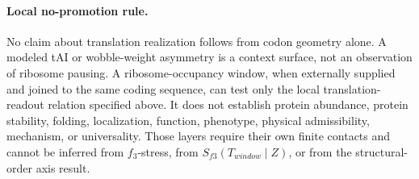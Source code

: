 \paragraph{Local no-promotion rule.}
No claim about translation realization follows from codon geometry alone.  A modeled tAI or wobble-weight asymmetry is a context surface, not an observation of ribosome pausing.  A ribosome-occupancy window, when externally supplied and joined to the same coding sequence, can test only the local translation-readout relation specified above.  It does not establish protein abundance, protein stability, folding, localization, function, phenotype, physical admissibility, mechanism, or universality.  Those layers require their own finite contacts and cannot be inferred from $f_3$-stress, from $S_{f3}(T_{window}\mid Z)$, or from the structural-order axis result.
